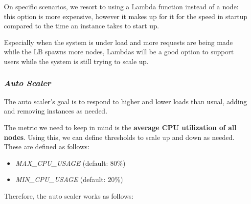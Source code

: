 \documentclass{article}
\begin{document}
On specific scenarios, we resort to using a Lambda function instead of a node:
this option is more expensive, however it makes up for it for the speed in
startup compared to the time an instance takes to start up.

Especially when the system is under load and more requests are being made while
the LB spawns more nodes, Lambdas will be a good option to support users while
the system is still trying to scale up.

\subsubsection{\textit{Auto Scaler}}

The auto scaler's goal is to respond to higher and lower loads than usual,
adding and removing instances as needed.

The metric we need to keep in mind is the \textbf{average CPU utilization of all
nodes}. Using this, we can define thresholds to scale up and down as needed.
These are defined as follows:

\begin{itemize}
    \item \textit{MAX\_CPU\_USAGE} (default: 80\%)
    \item \textit{MIN\_CPU\_USAGE} (default: 20\%)
\end{itemize}

Therefore, the auto scaler works as follows:
\end{document}
